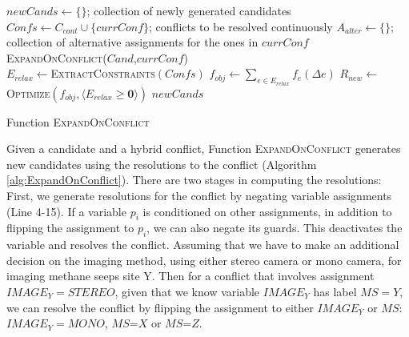 \documentclass[jair,twoside,11pt,theapa]{article}
\let\oldnl\nl%
\newcommand{\nonl}{\renewcommand{\nl}{\let\nl\oldnl}}%
\begin{document}
\begin{algorithm}[h!]
	\SetAlgoLined
	\Indm
	\Initialize{}
	\Indp
	{$\mathit{newCands}\leftarrow \{\}$}; collection of newly generated candidates\;
	{$\mathit{Confs}\leftarrow C_{cont}\cup \{\mathit{currConf}\}$; conflicts to be resolved
		continuously}\;
	{$A_{alter}\leftarrow \{\}$}; collection of alternative assignments for the ones in $\mathit{currConf}$\;
	\Indm
	\Algorithm{}
	\nonl\textsc{ExpandOnConflict}($\mathit{Cand}$,$\mathit{currConf}$)\\
	\Indp
	$E_{relax}\leftarrow$\textsc{ExtractConstraints}$(\mathit{Confs})$\;
	$f_{obj}\leftarrow\sum_{e\in E_{relax}}f_e(\Delta e)$\;
	$R_{new}\leftarrow$\textsc{Optimize}$(f_{obj},\langle
	E_{relax}\geq \textbf{0}\rangle )$\;
	\Return $\mathit{newCands}$\;
	\caption{Function \textsc{ExpandOnConflict}}
	\label{alg:ExpandOnConflict}
\end{algorithm}



Given a candidate and a hybrid conflict, Function \textsc{ExpandOnConflict} generates
new candidates using the resolutions to the conflict (Algorithm
\ref{alg:ExpandOnConflict}). There are two stages in computing the resolutions:
First, we generate resolutions for the conflict by negating variable assignments
(Line 4-15). If a variable $p_i$ is conditioned on other assignments, in
addition to flipping the assignment to $p_i$, we can also negate its guards. This
deactivates the variable and resolves the conflict. Assuming that we have to make an additional decision on the imaging method, using either stereo camera or mono camera, for imaging methane seeps site Y. Then for a conflict that involves assignment $\mathit{IMAGE_Y=STEREO}$, given that we know variable $\mathit{IMAGE_Y}$ has label $MS=Y$, we can resolve the conflict by flipping the assignment to either $\mathit{IMAGE_Y}$ or $MS$: $\mathit{IMAGE_Y=MONO}$, $MS$=$X$ or $MS$=$Z$.
\end{document}
